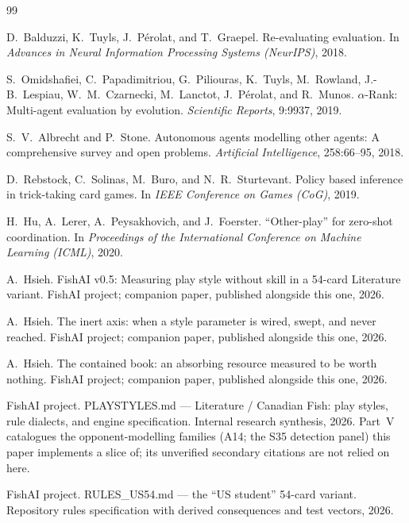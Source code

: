 \documentclass[11pt]{article}
\begin{document}
\begin{thebibliography}{99}
\footnotesize

D.~Balduzzi, K.~Tuyls, J.~P\'erolat, and T.~Graepel.
\newblock Re-evaluating evaluation.
\newblock In \emph{Advances in Neural Information Processing Systems (NeurIPS)}, 2018.

S.~Omidshafiei, C.~Papadimitriou, G.~Piliouras, K.~Tuyls, M.~Rowland, J.-B.~Lespiau,
W.~M.~Czarnecki, M.~Lanctot, J.~P\'erolat, and R.~Munos.
\newblock $\alpha$-Rank: Multi-agent evaluation by evolution.
\newblock \emph{Scientific Reports}, 9:9937, 2019.

S.~V.~Albrecht and P.~Stone.
\newblock Autonomous agents modelling other agents: A comprehensive survey and open
problems.
\newblock \emph{Artificial Intelligence}, 258:66--95, 2018.

D.~Rebstock, C.~Solinas, M.~Buro, and N.~R.~Sturtevant.
\newblock Policy based inference in trick-taking card games.
\newblock In \emph{IEEE Conference on Games (CoG)}, 2019.

H.~Hu, A.~Lerer, A.~Peysakhovich, and J.~Foerster.
\newblock ``Other-play'' for zero-shot coordination.
\newblock In \emph{Proceedings of the International Conference on Machine Learning
(ICML)}, 2020.

A.~Hsieh.
\newblock FishAI v0.5: Measuring play style without skill in a 54-card Literature
variant.
\newblock FishAI project; companion paper, published alongside this one, 2026.

A.~Hsieh.
\newblock The inert axis: when a style parameter is wired, swept, and never reached.
\newblock FishAI project; companion paper, published alongside this one, 2026.

A.~Hsieh.
\newblock The contained book: an absorbing resource measured to be worth nothing.
\newblock FishAI project; companion paper, published alongside this one, 2026.

FishAI project.
\newblock PLAYSTYLES.md --- Literature / Canadian Fish: play styles, rule dialects, and
engine specification.
\newblock Internal research synthesis, 2026. Part~V catalogues the opponent-modelling
families (A14; the S35 detection panel) this paper implements a slice of; its unverified
secondary citations are not relied on here.

FishAI project.
\newblock RULES\_US54.md --- the ``US student'' 54-card variant.
\newblock Repository rules specification with derived consequences and test vectors, 2026.


\end{thebibliography}
\end{document}
